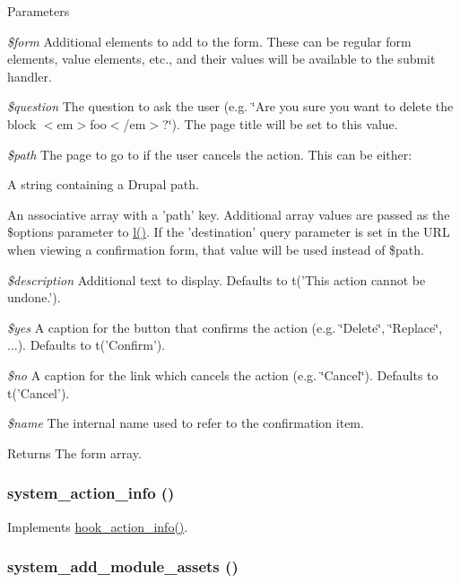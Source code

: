 \begin{DoxyParams}{Parameters}
\item[{\em \$form}]Additional elements to add to the form. These can be regular form elements, value elements, etc., and their values will be available to the submit handler. \item[{\em \$question}]The question to ask the user (e.g. \char`\"{}Are you sure you want to delete the
   block $<$em$>$foo$<$/em$>$?\char`\"{}). The page title will be set to this value. \item[{\em \$path}]The page to go to if the user cancels the action. This can be either:
\begin{DoxyItemize}
\item A string containing a Drupal path.
\item An associative array with a 'path' key. Additional array values are passed as the \$options parameter to \hyperlink{common_8inc_ad3b36c06dc46250b8d22b8d0d2e7bd97}{l()}. If the 'destination' query parameter is set in the URL when viewing a confirmation form, that value will be used instead of \$path. 
\end{DoxyItemize}\item[{\em \$description}]Additional text to display. Defaults to t('This action cannot be undone.'). \item[{\em \$yes}]A caption for the button that confirms the action (e.g. \char`\"{}Delete\char`\"{}, \char`\"{}Replace\char`\"{}, ...). Defaults to t('Confirm'). \item[{\em \$no}]A caption for the link which cancels the action (e.g. \char`\"{}Cancel\char`\"{}). Defaults to t('Cancel'). \item[{\em \$name}]The internal name used to refer to the confirmation item.\end{DoxyParams}
\begin{DoxyReturn}{Returns}
The form array. 
\end{DoxyReturn}
\hypertarget{system_8module_aeea00f3322d9a388335950f421935835}{
\subsubsection[{system\_\-action\_\-info}]{\setlength{\rightskip}{0pt plus 5cm}system\_\-action\_\-info ()}}
\label{system_8module_aeea00f3322d9a388335950f421935835}
Implements \hyperlink{group__actions_ga3df26c5d6496c91fcd0edd8648023fb4}{hook\_\-action\_\-info()}. \hypertarget{system_8module_a18ac9a2acd0bfebb08156b711c8451a3}{
\subsubsection[{system\_\-add\_\-module\_\-assets}]{\setlength{\rightskip}{0pt plus 5cm}system\_\-add\_\-module\_\-assets ()}}

